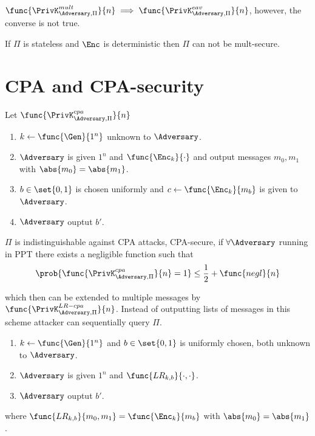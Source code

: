 \begin{proposition}
    \(\func{\PrivK_{\Adversary, \Pi}^{mult}}{n} \implies \func{\PrivK_{\Adversary, \Pi}^{eav}}{n}\), however, the converse is not true. 
\end{proposition}

\begin{proposition}
    If \(\Pi\) is stateless and \(\Enc\) is deterministic then \(\Pi\) can not be mult-secure.
\end{proposition}

\section{CPA and CPA-security}
Let \(\func{\PrivK_{\Adversary,\Pi}^{cpa}}{n}\)
\begin{enumerate}
    \item \(k \gets \func{\Gen}{1^n}\) unknown to \(\Adversary\).
    \item \(\Adversary\) is given \(1^n\) and \(\func{\Enc_k}{\cdot}\) and output messages \(m_0,m_1\) with \(\abs{m_0} = \abs{m_1}\).
    \item \(b \in \set{0,1}\) is chosen uniformly and \(c \gets \func{\Enc_k}{m_b}\) is given to \(\Adversary\).
    \item \(\Adversary\) ouptut \(b'\).
\end{enumerate}

\(\Pi\) is indistinguishable against CPA attacks, CPA-secure, if \(\forall \Adversary\) running in PPT there exists a negligible function such that 
\begin{equation*}
    \prob{\func{\PrivK_{\Adversary,\Pi}^{cpa}}{n} = 1} \leq \frac{1}{2} + \func{negl}{n}
\end{equation*}

which then can be extended to multiple messages by \(\func{\PrivK_{\Adversary,\Pi}^{LR-cpa}}{n}\). Instead of outputting lists of messages in this scheme attacker can sequentially query \(\Pi\). 
\begin{enumerate}
    \item \(k \gets \func{\Gen}{1^n}\) and \(b \in \set{0,1}\) is uniformly chosen, both unknown to \(\Adversary\).
    \item \(\Adversary\) is given \(1^n\) and \(\func{LR_{k,b}}{\cdot, \cdot}\).
    \item \(\Adversary\) ouptut \(b'\).
\end{enumerate}
where \(\func{LR_{k,b}}{m_0, m_1} = \func{\Enc_{k}}{m_b}\) with \(\abs{m_0}= \abs{m_1}\).

